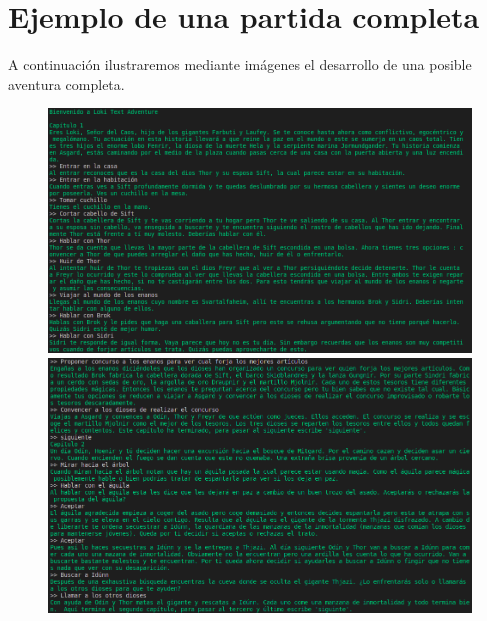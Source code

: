 \documentclass[12pt]{article}
\begin{document}
\section{Ejemplo de una partida completa}

A continuaci\'on ilustraremos mediante im\'agenes el desarrollo de una posible aventura completa.

\begin{figure}[h]
	\begin{center}
		\includegraphics[width =15.0cm]{./img/Historia1.png}
		\includegraphics[width =15.0cm]{./img/Historia2.png}
		
	\end{center}
\end{figure}
\end{document}
